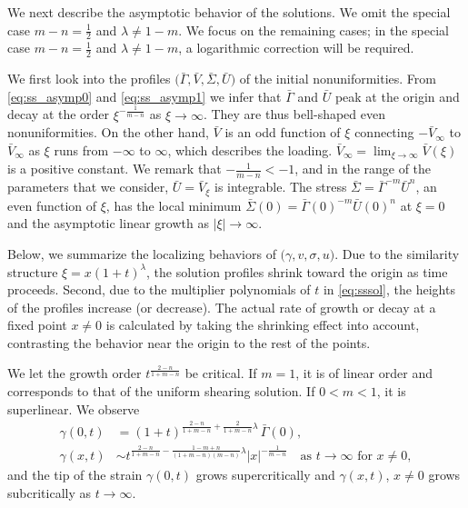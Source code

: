 \documentclass[a4paper,11pt]{article}
\def\bG{\bar{\Gamma}}
\def\bS{\bar{\Sigma}}
\def\bV{\bar{V}}
\def\bU{\bar{U}}
\numberwithin{step}{dummy}
\begin{document}
We next describe the asymptotic behavior of the solutions. We omit the special case $m-n= \frac{1}{2}$ and $\lambda \ne 1-m$. We focus on the remaining cases;
in  the special case $m-n= \frac{1}{2}$ and $\lambda\ne1-m$, a  logarithmic correction will be required.


\medskip \noindent{\bf Initial nonuniformities $\big(\bG,\bV,\bS,\bU\big)$.} \medskip
We first look into the profiles $\big(\bG,\bV,\bS,\bU\big)$ of the initial nonuniformities. 
From \eqref{eq:ss_asymp0} and \eqref{eq:ss_asymp1} we infer that $\bG$ and $\bU$ peak at the origin and decay at the order $\xi^{ -\frac{1}{m-n}}$ as $\xi \rightarrow \infty$. 
They are thus bell-shaped even nonuniformities. On the other hand, $\bV$ is an odd function of $\xi$ connecting $-\bV_\infty$ to $\bV_\infty$ as $\xi$ runs from $-\infty$ to $\infty$, which describes the loading. $\bV_\infty= \lim_{\xi \rightarrow \infty} \bV(\xi)$ is a positive constant. We remark that $-\frac{1}{m-n} < -1$, and in the range of the parameters that we consider, $\bU=\bV_\xi$ is integrable. The stress $\bS=\bG^{-m}\bU^n$, an even function of $\xi$, has the local minimum $\bS(0)=\bG(0)^{-m}\bU(0)^n$ at $\xi=0$ and the asymptotic linear growth as $|\xi| \rightarrow \infty$.
\medskip

Below, we summarize the localizing behaviors of $\big(\gamma,v,\sigma,u\big)$. Due to the similarity structure $\xi=x(1+t)^\lambda$, the solution profiles shrink toward 
the origin as time proceeds. Second, 
due to the multiplier polynomials of $t$ in \eqref{eq:sssol}, the heights of the profiles increase (or decrease). The actual rate of growth or decay  at a fixed point $x\ne0$ is calculated by taking the shrinking effect into account, contrasting the behavior near the origin to the rest of the points.

We let the growth order $t^{ \frac{2-n}{1+m-n}}$ be critical. If $m=1$, it is of linear order and corresponds to that of the uniform shearing solution. If $0<m<1$, it is superlinear. We observe
\begin{align*}
 \gamma(0,t) &= (1+t)^{ \frac{2-n}{1+m-n}+ \frac{ 2 }{1+m-n}\lambda }\,\bG(0),\\
 \gamma(x,t) &\sim t^{ \frac{2-n}{1+m-n}- \frac{ 1-m+n }{(1+m-n)(m-n)}\lambda } |x|^{-\frac{1}{m-n}} \quad \text{as $t \rightarrow \infty$ for $x\ne 0$},
\end{align*}
and the tip of the strain $\gamma(0,t)$ grows supercritically and $\gamma(x,t)$, $x\ne 0$ grows subcritically as $t \rightarrow \infty$.
\end{document}
